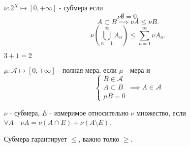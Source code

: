 \begin{definition} \thmslashn 

    $\nu : 2^{X} \mapsto [0, +\infty]$ - субмера если
    \[ \nu \emptyset = 0 .\]
    \[ A \subset B \implies \nu A \le \nu B .\]
    \[ \nu\left( \bigcup_{n=1}^{\infty} A_{n}  \right) \le \sum\limits_{n=1}^{\infty} \nu A_{n}  .\] 
\end{definition}
\begin{remark} \thmslashn

    $3 + 1 = 2$
\end{remark}
\begin{definition} \thmslashn 

    $\mu : \mathcal{A} \mapsto [0, +\infty]$ - полная мера, если $\mu$ - мера и 
    \begin{equation*}
        \begin{cases}
            B\in \mathcal{A}\\
            A \subset B\\
            \mu B = 0
        \end{cases} \implies
        A\in \mathcal{A}
    \end{equation*}
\end{definition}
\begin{definition} \thmslashn 

    $\nu$ - субмера, $E$ - измеримое относительно $\nu$ множество, если $\forall{A}\quad \nu A = \nu(A\cap E) + \nu(A \setminus E)$.
\end{definition}
\begin{remark} \thmslashn

    Субмера гарантирует $\le $, важно толко $\ge $.
\end{remark}
